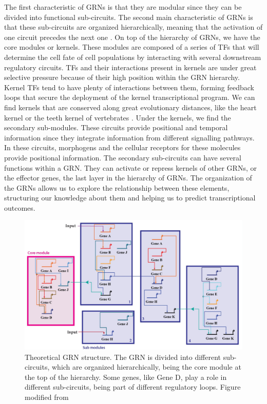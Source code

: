 The first characteristic of GRNs is that they are modular since they can be divided into functional sub-circuits. The second main characteristic of GRNs is that these sub-circuits are organized hierarchically, meaning that the activation of one circuit precedes the next one \parencite{davidson_gene_2006, wagner_developmental_2007}. On top of the hierarchy of GRNs, we have the core modules or kernels. These modules are composed of a series of TFs that will determine the cell fate of cell populations by interacting with several downstream regulatory circuits. TFs and their interactions present in kernels are under great selective pressure because of their high position within the GRN hierarchy. Kernel TFs tend to have plenty of interactions between them, forming feedback loops that secure the deployment of the kernel transcriptional program. We can find kernels that are conserved along great evolutionary distances, like the heart kernel \parencite{wijesena_antagonistic_2017} or the teeth kernel of vertebrates \parencite{sadier_role_2020}. Under the kernels, we find the secondary sub-modules. These circuits provide positional and temporal information since they integrate information from different signalling pathways. In these circuits, morphogens and the cellular receptors for these molecules provide positional information. The secondary sub-circuits can have several functions within a GRN. They can activate or repress kernels of other GRNs, or the effector genes, the last layer in the hierarchy of GRNs. The organization of the GRNs allows us to explore the relationship between these elements, structuring our knowledge about them and helping us to predict transcriptional outcomes. 

\begin{figure}[ht]
\centering
\includegraphics[width=1\textwidth]{Figures/Intro/GRN_structure}
\caption[GRN structure]{ Theoretical GRN structure. The GRN is divided into different sub-circuits, which are organized hierarchically, being the core module at the top of the hierarchy. Some genes, like Gene D, play a role in different sub-circuits, being part of different regulatory loops. Figure modified from \parencite{sadier_role_2020}}
\label{fig:Intro_grn_structure}
\end{figure} 


